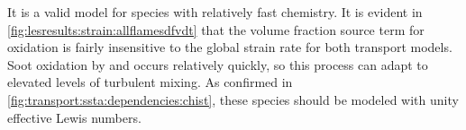 It is a valid model for species with relatively fast chemistry. It is evident in \cref{fig:lesresults:strain:allflamesdfvdt} that the volume fraction source term for oxidation is fairly insensitive to the global strain rate for both transport models. Soot oxidation by  and  occurs relatively quickly, so this process can adapt to elevated levels of turbulent mixing. As confirmed in \cref{fig:transport:ssta:dependencies:chist}, these species should be modeled with unity effective Lewis numbers. %
